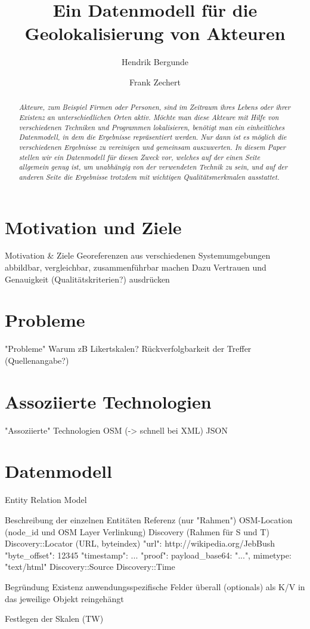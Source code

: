 \documentclass[twocolumn,10pt]{asme2ej}
\title{Ein Datenmodell für die Geolokalisierung von Akteuren}
\author{Hendrik Bergunde
    \affiliation{
	Masterstudent, Freie Universität Berlin\\
    Email: hendrik.bergunde@fu-berlin.de
    }	
}
\author{Frank Zechert
    \affiliation{
	Masterstudent, Freie Universität Berlin\\
    Email: frank.zechert@fu-berlin.de
    }	
}
\begin{document}
\maketitle    

\begin{abstract}
{\it Akteure, zum Beispiel Firmen oder Personen, sind im Zeitraum ihres Lebens oder ihrer Existenz an unterschiedlichen Orten aktiv. Möchte man diese Akteure mit Hilfe von verschiedenen Techniken und Programmen lokalisieren, benötigt man ein einheitliches Datenmodell, in dem die Ergebnisse repräsentiert werden. Nur dann ist es möglich die verschiedenen Ergebnisse zu vereinigen und gemeinsam auszuwerten. In diesem Paper stellen wir ein Datenmodell für diesen Zweck vor, welches auf der einen Seite allgemein genug ist, um unabhängig von der verwendeten Technik zu sein, und auf der anderen Seite die Ergebnisse trotzdem mit wichtigen Qualitätsmerkmalen ausstattet.}
\end{abstract}

\section{Motivation und Ziele}
Motivation \& Ziele
  Georeferenzen aus verschiedenen Systemumgebungen abbildbar, vergleichbar, zusammenführbar machen
  Dazu Vertrauen und Genauigkeit (Qualitätskriterien?) ausdrücken
  
\section{Probleme}
"Probleme"
Warum zB Likertskalen? 
Rückverfolgbarkeit der Treffer (Quellenangabe?)

\section{Assoziierte Technologien}
"Assoziierte" Technologien 
OSM (-> schnell bei XML) %
JSON

\section{Datenmodell}

Entity Relation Model

  Beschreibung der einzelnen Entitäten
    Referenz (nur "Rahmen")
    OSM-Location (node\_id und OSM Layer Verlinkung)
    Discovery (Rahmen für S und T)
    Discovery::Locator (URL, byteindex)
        "url": http://wikipedia.org/JebBush
        "byte\_offset": 12345 %
        "timestamp": ...
        "proof": { payload\_base64: "...", mimetype: "text/html" }
    Discovery::Source
    Discovery::Time

    Begründung Existenz anwendungsspezifische Felder überall (optionals) als K/V in das jeweilige Objekt reingehängt

  Festlegen der Skalen (TW)





\end{document}

